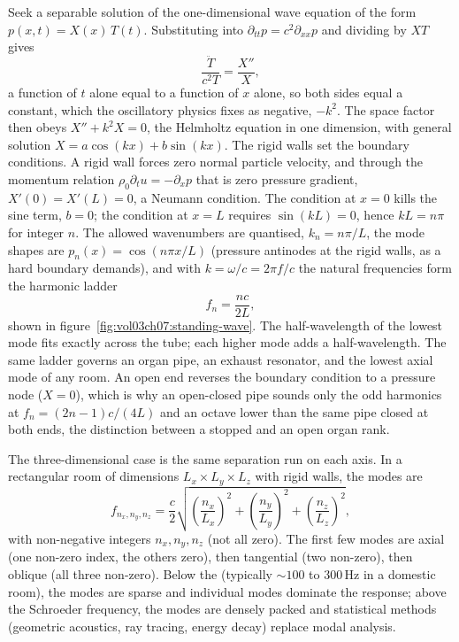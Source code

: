 Seek a separable solution of the one-dimensional wave equation of the
form $p(x,t) = X(x)\,T(t)$. Substituting into
$\partial_{tt}p = c^2\partial_{xx}p$ and dividing by $XT$ gives
\[
\frac{\ddot T}{c^2 T} = \frac{X''}{X},
\]
a function of $t$ alone equal to a function of $x$ alone, so both sides
equal a constant, which the oscillatory physics fixes as negative,
$-k^2$. The space factor then obeys $X'' + k^2 X = 0$, the Helmholtz
equation in one dimension, with general solution $X = a\cos(kx) +
b\sin(kx)$. The rigid walls set the boundary conditions. A rigid wall
forces zero normal particle velocity, and through the momentum relation
$\rho_0\partial_t u = -\partial_x p$ that is zero pressure gradient,
$X'(0) = X'(L) = 0$, a Neumann condition. The condition at $x=0$ kills
the sine term, $b=0$; the condition at $x=L$ requires $\sin(kL) = 0$,
hence $kL = n\pi$ for integer $n$. The allowed wavenumbers are quantised,
$k_n = n\pi/L$, the mode shapes are $p_n(x) = \cos(n\pi x/L)$ (pressure
antinodes at the rigid walls, as a hard boundary demands), and with
$k = \omega/c = 2\pi f/c$ the natural frequencies form the harmonic
ladder
\[
f_n = \frac{n c}{2L},
\]
shown in figure~\ref{fig:vol03ch07:standing-wave}. The half-wavelength of
the lowest mode fits exactly across the tube; each higher mode adds a
half-wavelength. The same ladder governs an organ pipe, an exhaust
resonator, and the lowest axial mode of any room. An open end reverses
the boundary condition to a pressure node ($X = 0$), which is why an
open-closed pipe sounds only the odd harmonics at $f_n = (2n-1)c/(4L)$
and an octave lower than the same pipe closed at both ends, the
distinction between a stopped and an open organ rank.



The three-dimensional case is the same separation run on each axis. In a
rectangular room of
dimensions $L_x \times L_y \times L_z$ with rigid walls, the modes
are
\[
f_{n_x, n_y, n_z} = \frac{c}{2}\sqrt{\left(\frac{n_x}{L_x}\right)^2
+ \left(\frac{n_y}{L_y}\right)^2 + \left(\frac{n_z}{L_z}\right)^2},
\]
with non-negative integers $n_x, n_y, n_z$ (not all zero). The first
few modes are axial (one non-zero index, the others zero), then
tangential (two non-zero), then oblique (all three non-zero). Below
the  (typically $\sim 100$ to $300\,\si{
\hertz}$ in a domestic room), the modes are sparse and individual
modes dominate the response; above the Schroeder frequency, the
modes are densely packed and statistical methods (geometric
acoustics, ray tracing, energy decay) replace modal analysis.

